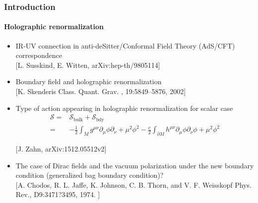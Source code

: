 \documentclass[french]{beamer}
\begin{document}
\begin{frame}[shrink=10]
\frametitle{Introduction}
\framesubtitle{Holographic renormalization}

\begin{itemize}

\item %
IR-UV connection in anti-deSitter/Conformal Field Theory (AdS/CFT) correspondence
\\
\tiny\color{blue}[L. Susskind, E. Witten, arXiv:hep-th/9805114]\color{black}\normalsize

\item Boundary field and holographic renormalization
\\
\tiny\color{blue}[K. Skenderis
Class. Quant. Grav.
,
19:5849–5876, 2002]\color{black}\normalsize

\item Type of action appearing in holographic renormalization for scalar case
\begin{equation*}
\begin{split}
\mathcal{S} = & \mathcal{S}_{\mathrm{bulk}} + \mathcal{S}_{\mathrm{bdy}}
\\ = &
-\frac 1 2 \int_M g^{\mu\nu} \partial_\mu \phi \partial_{\nu} + 
\mu^2\phi^2 - \frac c 2 \int_{\partial M}h^{\mu\nu}\partial_\mu\phi\partial_\nu\phi + \mu^2\phi^2
\end{split}
\end{equation*}

\tiny\color{blue}[J. Zahn,  arXiv:1512.05512v2]\color{black}\normalsize

\item The case of Dirac fields and the vacuum polarization under the new boundary condition (generalized bag boundary condition)?
\\
\tiny\color{blue}[A. Chodos, R. L. Jaffe, K. Johnson, C. B. Thorn, and V. F. Weisskopf Phys. Rev., D9:3471?3495, 1974.
]\color{black}\normalsize

\end{itemize}

\end{frame}
\end{document}
